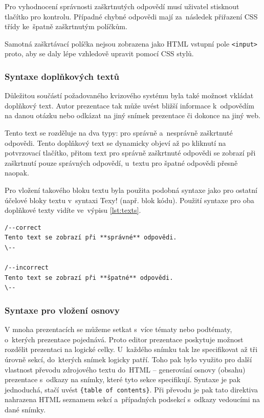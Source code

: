 \documentclass[11pt,twoside,a4paper]{book}
\begin{document}
Pro vyhodnocení správnosti zaškrtnutých odpovědí musí uživatel stisknout tlačítko pro kontrolu. Případné chybné odpovědi mají za~následek přiřazení CSS třídy ke~špatně zaškrtnutým políčkům.

Samotná zaškrtávací políčka nejsou zobrazena jako HTML vstupní pole \verb|<input>| proto, aby se daly lépe vzhledově upravit pomocí CSS stylů.

\subsubsection{Syntaxe doplňkových textů}
Důležitou součástí požadovaného kvizového systému byla také možnost vkládat doplňkový text. Autor prezentace tak může uvést bližší informace k~odpovědím na danou otázku nebo odkázat na jiný snímek prezentace či dokonce na jiný web.

Tento text se rozděluje na dva typy: pro správně a~nesprávně zaškrtnuté odpovědi. Tento doplňkový text se dynamicky objeví až po kliknutí na potvrzovací tlačítko, přitom text pro správně zaškrtnuté odpovědi se zobrazí při zaškrtnutí pouze správných odpovědí, u~textu pro špatné odpovědi přesně naopak.

Pro vložení takového bloku textu byla použita podobná syntaxe jako pro ostatní účelové bloky textu v~syntaxi Texy!
(např. blok kódu). Použití syntaxe pro oba doplňkové texty vidíte ve~výpisu \ref{lst:texts}.

\begin{lstlisting}[caption={Syntaxe doplňkových textů},label={lst:texts},captionpos=b]
/--correct
Tento text se zobrazí při **správné** odpovědi.
\--

/--incorrect
Tento text se zobrazí při **špatné** odpovědi.
\--
\end{lstlisting}

\subsubsection{Syntaxe pro vložení osnovy}
V mnoha prezentacích se můžeme setkat s~více tématy nebo podtématy, o~kterých prezentace pojednává. Proto editor prezentace poskytuje možnost rozdělit prezentaci na logické celky. U~každého snímku tak lze specifikovat až tři úrovně sekcí, do~kterých snímek logicky patří. Toho pak bylo využito pro další vlastnost převodu zdrojového textu do~HTML – generování osnovy (obsahu) prezentace s~odkazy na snímky, které tyto sekce specifikují. Syntaxe je pak jednoduchá, stačí uvést \verb|{table of contents}|. Při převodu je pak tato direktiva nahrazena HTML seznamem sekcí a~případných podsekcí s~odkazy vedoucími na dané snímky.
\end{document}
